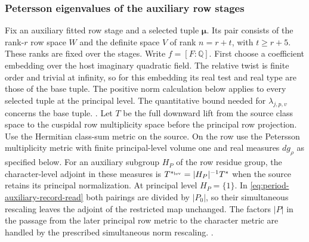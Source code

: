 \subsubsection{Petersson eigenvalues of the auxiliary row stages}\label{sec:stage-petersson}
Fix an auxiliary fitted row stage and a selected tuple
\(\boldsymbol\mu\). Its pair consists of the rank-\(r\) row space
\(W\) and the definite space \(V\) of rank \(n=r+t\), with
\(t\ge r+5\). These ranks are fixed over the stages. Write
\(f=[F:\mathbb Q]\). First choose a coefficient embedding over
the host imaginary quadratic field. The relative twist is
finite order and trivial at infinity, so for this embedding
its real test and real type are those of the base tuple.
The positive norm calculation below applies to every selected
tuple at the principal level. The quantitative bound needed
for \(\lambda_{j,p,v}\) concerns the base tuple.
.
Let \(T\) be the full downward lift from the source class space to
the cuspidal row multiplicity space before the principal row
projection. Use the Hermitian class-sum metric on the source.
On the row use the Petersson multiplicity metric with finite
principal-level volume one and real measures \(dg_\rho\) as
specified below. For an auxiliary subgroup \(H_P\) of the row
residue group, the character-level adjoint in these measures is
\(T^{*_{\rm lev}}=|H_P|^{-1}T^*\) when the source retains its
principal normalization. At principal level \(H_P=\{1\}\).
In \eqref{eq:period-auxiliary-record-read} both pairings are
divided by \(|P_0|\), so their simultaneous rescaling leaves
the adjoint of the restricted map unchanged. The factors \(|P|\) in the passage from the later
principal row metric to the character metric are handled by the
prescribed simultaneous norm rescaling.
.

